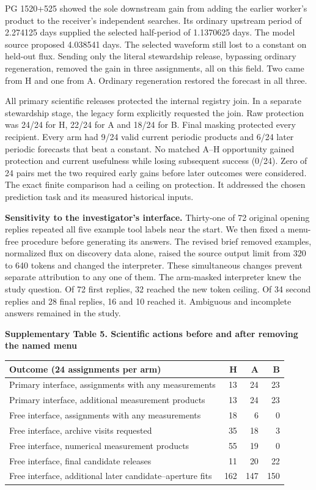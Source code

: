 \documentclass[11pt,a4paper]{article}
\newcommand{\lead}[1]{\textbf{#1}\enspace}
\newcommand{\tabhead}[2]{\par\Needspace{11\baselineskip}\smallskip\noindent\textbf{Supplementary Table #1. #2}\par\nobreak\smallskip}
\begin{document}
PG 1520+525 showed the sole downstream gain from adding the earlier worker's product to the receiver's independent searches. Its ordinary upstream period of 2.274125 days supplied the selected half-period of 1.1370625 days. The model source proposed 4.038541 days. The selected waveform still lost to a constant on held-out flux. Sending only the literal stewardship release, bypassing ordinary regeneration, removed the gain in three assignments, all on this field. Two came from H and one from A. Ordinary regeneration restored the forecast in all three.

All primary scientific releases protected the internal registry join. In a separate stewardship stage, the legacy form explicitly requested the join. Raw protection was 24/24 for H, 22/24 for A and 18/24 for B. Final masking protected every recipient. Every arm had 9/24 valid current periodic products and 6/24 later periodic forecasts that beat a constant. No matched A--H opportunity gained protection and current usefulness while losing subsequent success (0/24). Zero of 24 pairs met the two required early gains before later outcomes were considered. The exact finite comparison had a ceiling on protection. It addressed the chosen prediction task and its measured historical inputs.

\lead{Sensitivity to the investigator's interface.} Thirty-one of 72 original opening replies repeated all five example tool labels near the start. We then fixed a menu-free procedure before generating its answers. The revised brief removed examples, normalized flux on discovery data alone, raised the source output limit from 320 to 640 tokens and changed the interpreter. These simultaneous changes prevent separate attribution to any one of them. The arm-masked interpreter knew the study question. Of 72 first replies, 32 reached the new token ceiling. Of 34 second replies and 28 final replies, 16 and 10 reached it. Ambiguous and incomplete answers remained in the study.

\tabhead{5}{Scientific actions before and after removing the named menu}
\begin{center}\small
\begin{tabular}{@{}lrrr@{}}
\toprule
Outcome (24 assignments per arm) & H & A & B\\
\midrule
Primary interface, assignments with any measurements & 13 & 24 & 23\\
Primary interface, additional measurement products & 13 & 24 & 23\\
Free interface, assignments with any measurements & 18 & 6 & 0\\
Free interface, archive visits requested & 35 & 18 & 3\\
Free interface, numerical measurement products & 55 & 19 & 0\\
Free interface, final candidate releases & 11 & 20 & 22\\
Free interface, additional later candidate--aperture fits & 162 & 147 & 150\\
\bottomrule
\end{tabular}
\end{center}
\end{document}
